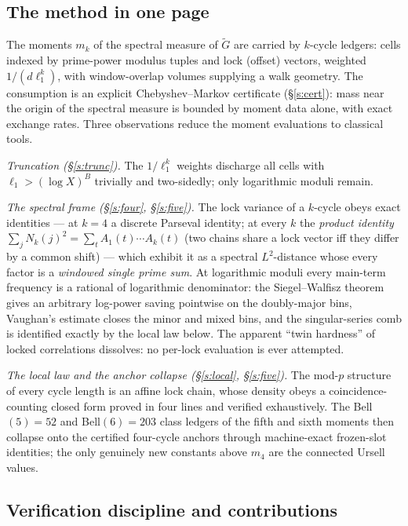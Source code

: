 \documentclass[11pt]{article}
\numberwithin{equation}{section}
\theoremstyle{definition}
\theoremstyle{remark}
\begin{document}
\subsection*{The method in one page}

The moments $m_k$ of the spectral measure of $\widetilde G$ are
carried by $k$-cycle ledgers: cells indexed by prime-power
modulus tuples and lock (offset) vectors, weighted
$1/(d\ell_1^{k})$, with window-overlap volumes supplying a walk
geometry. The consumption is an explicit Chebyshev--Markov
certificate (\S\ref{s:cert}): mass near the origin of the
spectral measure is bounded by moment data alone, with exact
exchange rates. Three observations reduce the moment evaluations
to classical tools.

\emph{Truncation (\S\ref{s:trunc}).} The $1/\ell_1^{k}$ weights
discharge all cells with $\ell_1>(\log X)^{B}$ trivially and
two-sidedly; only logarithmic moduli remain.

\emph{The spectral frame (\S\ref{s:four}, \S\ref{s:five}).} The
lock variance of a $k$-cycle obeys exact identities --- at $k=4$
a discrete Parseval identity; at every $k$ the \emph{product
identity} $\sum_j N_k(j)^2=\sum_t A_1(t)\cdots A_k(t)$ (two
chains share a lock vector iff they differ by a common shift) ---
which exhibit it as a spectral $L^2$-distance whose every factor
is a \emph{windowed single prime sum}. At logarithmic moduli
every main-term frequency is a rational of logarithmic
denominator: the Siegel--Walfisz theorem gives an arbitrary
log-power saving pointwise on the doubly-major bins, Vaughan's
estimate closes the minor and mixed bins, and the singular-series
comb is identified exactly by the local law below. The apparent
``twin hardness'' of locked correlations dissolves: no per-lock
evaluation is ever attempted.

\emph{The local law and the anchor collapse (\S\ref{s:local},
\S\ref{s:five}).} The mod-$p$ structure of every cycle length is
an affine lock chain, whose density obeys a coincidence-counting
closed form proved in four lines and verified exhaustively. The
Bell$(5)=52$ and Bell$(6)=203$ class ledgers of the fifth and
sixth moments then collapse onto the certified four-cycle
anchors through machine-exact frozen-slot identities; the only
genuinely new constants above $m_4$ are the connected Ursell
values.

\subsection*{Verification discipline and contributions}
\end{document}
